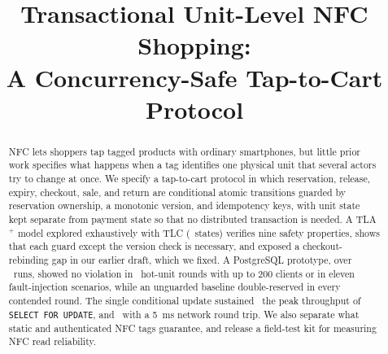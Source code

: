 \documentclass[conference]{IEEEtran}
\begin{document}
\title{Transactional Unit-Level NFC Shopping:\\
A Concurrency-Safe Tap-to-Cart Protocol}

\author{
\and
{}
\and
{}
\and
{}
}

\maketitle

\begin{abstract}
NFC lets shoppers tap tagged products with ordinary smartphones, but
little prior work specifies what happens when a tag identifies one
physical unit that several actors try to change at once. We specify a
tap-to-cart protocol in which reservation, release, expiry, checkout,
sale, and return are conditional atomic transitions guarded by
reservation ownership, a monotonic version, and idempotency keys, with
unit state kept separate from payment state so that no distributed
transaction is needed. A TLA$^{+}$ model explored exhaustively with
TLC (\TLAStates\ states) verifies nine safety properties, shows that
each guard except the version check is necessary, and exposed a
checkout-rebinding gap in our earlier draft, which we fixed. A
PostgreSQL prototype, over \NRuns\ runs, showed no violation in
\HotTotalRounds\ hot-unit rounds with up to 200 clients or in eleven
fault-injection scenarios, while an unguarded baseline double-reserved
in every contended round. The single conditional update sustained
\LowCUpeakX\ the peak throughput of \texttt{SELECT~FOR~UPDATE}, and
\RTTx\ with a 5~ms network round trip. We also separate what static
and authenticated NFC tags guarantee, and release a field-test kit for
measuring NFC read reliability.
\end{abstract}
\end{document}
